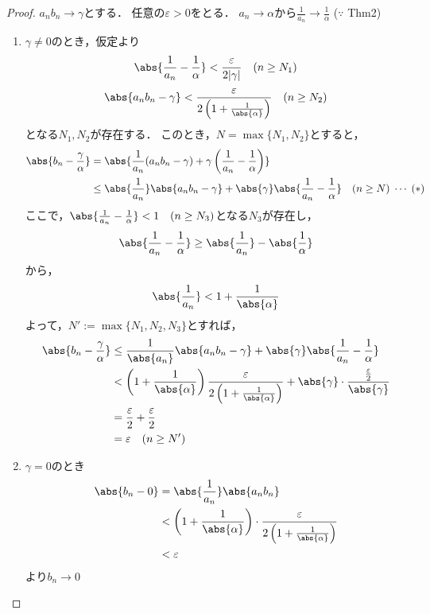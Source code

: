 \documentclass[uplatex,dvipdfmx,a4paper,10pt,fleqn]{jsarticle}
\begin{document}
 \begin{leftbar} \begin{proof}
    $a_n b_n \to \gamma$とする．
    任意の$\varepsilon > 0$をとる．
    $a_n \to \alpha$から$\frac{1}{a_n} \to \frac{1}{\alpha}$ ($\because$ Thm2)
    \begin{enumerate}[label = (\roman*)]
      \item $\gamma \ne 0$のとき，仮定より
            \[
              \abs{\frac{1}{a_n} - \frac{1}{\alpha}} < \frac{\varepsilon}{2 \lvert \gamma \rvert} \quad (n \geq N_1)
            \]
            \[
              \abs{a_n b_n - \gamma} < \frac{\varepsilon}{2 \left( 1 + \frac{1}{\abs{\alpha}} \right)} \quad (n \geq N_2)
            \]
            となる$N_1, N_2$が存在する．
            このとき，$N = \max \{ N_1, N_2 \}$とすると，
            \begin{align*}
              \abs{b_n - \frac{\gamma}{\alpha}}
              &= \abs{\frac{1}{a_n}(a_n b_n - \gamma) + \gamma \left( \frac{1}{a_n} - \frac{1}{\alpha} \right)} \\
              &\leq \abs{\frac{1}{a_n}} \abs{a_n b_n - \gamma} + \abs{\gamma} \abs{\frac{1}{a_n} - \frac{1}{\alpha}} \quad (n \geq N) \; \cdots \; (*)
            \end{align*}
            ここで，$\abs{\frac{1}{a_n} - \frac{1}{\alpha}} < 1 \quad (n \geq N_3)$となる$N_3$が存在し，
            \[
              \abs{\frac{1}{a_n} - \frac{1}{\alpha}} \geq \abs{\frac{1}{a_n}} - \abs{\frac{1}{\alpha}}
            \]
            から，
            \[
              \abs{\frac{1}{a_n}} < 1 + \frac{1}{\abs{\alpha}}
            \]
            よって，$N' := \max\{ N_1, N_2, N_3 \}$とすれば，
            \begin{align*}
              \abs{b_n - \frac{\gamma}{\alpha}}
              &\leq \frac{1}{\abs{a_n}} \abs{a_n b_n - \gamma} + \abs{\gamma} \abs{\frac{1}{a_n} - \frac{1}{\alpha}} \\
              &< \left( 1 + \frac{1}{\abs{\alpha}} \right) \frac{\varepsilon}{2 \left( 1 + \frac{1}{\abs{\alpha}} \right)} + \abs{\gamma} \cdot \frac{\, \frac{\varepsilon}{2} \,}{\abs{\gamma}} \\
              &= \frac{\varepsilon}{2} + \frac{\varepsilon}{2} \\
              &= \varepsilon \quad (n \geq N')
            \end{align*}
      \item $\gamma = 0$のとき
            \begin{align*}
              \abs{b_n - 0}
              &= \abs{\frac{1}{a_n}} \abs{a_n b_n} \\
              &< \left( 1 + \frac{1}{\abs{\alpha}} \right) \cdot \frac{\varepsilon}{2 \left( 1 + \frac{1}{\abs{\alpha}} \right)} \\
              &< \varepsilon
            \end{align*}
            より$b_n \to 0$
    \end{enumerate}
  \end{proof}
\end{leftbar}
\end{document}
